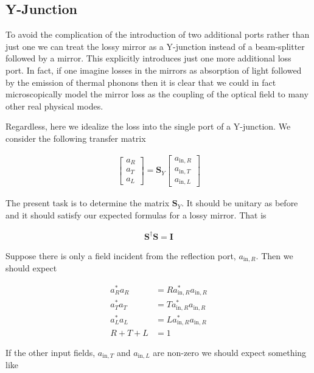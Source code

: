 \documentclass[12pt]{article}
\newcommand{\bv}[1]{\boldsymbol{#1}}
\begin{document}
\subsection{Y-Junction}
To avoid the complication of the introduction of two additional ports rather than just one we can treat the lossy mirror as a Y-junction instead of a beam-splitter followed by a mirror. This explicitly introduces just one more additional loss port. In fact, if one imagine losses in the mirrors as absorption of light followed by the emission of thermal phonons then it is clear that we could in fact microscopically model the mirror loss as the coupling of the optical field to many other real physical modes.

Regardless, here we idealize the loss into the single port of a Y-junction. We consider the following transfer matrix

\begin{align}
\begin{bmatrix}
a_R\\ a_T\\ a_L
\end{bmatrix} = 
\bv{S}_Y 
\begin{bmatrix}
a_{\text{in},R}\\ a_{\text{in},T} \\ a_{\text{in},L}
\end{bmatrix}
\end{align}

The present task is to determine the matrix $\bv{S}_Y$. It should be unitary as before and it should satisfy our expected formulas for a lossy mirror. That is

\begin{align}
\bv{S}^{\dag}\bv{S} = \bv{I}
\end{align}

Suppose there is only a field incident from the reflection port, $a_{\text{in},R}$. Then we should expect

\begin{align}
a_R^* a_R &= R a_{\text{in},R}^*a_{\text{in},R}\\
a_T^* a_T &= T a_{\text{in},R}^*a_{\text{in},R}\\
a_L^* a_L &= L a_{\text{in},R}^*a_{\text{in},R}\\
R+T+L &= 1
\end{align}

If the other input fields, $a_{\text{in},T}$ and $a_{\text{in},L}$ are non-zero we should expect something like
\end{document}
